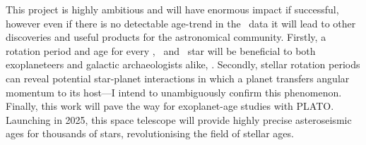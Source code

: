 This project is highly ambitious and will have enormous impact if successful,
however even if there is no detectable age-trend in the \Kepler\ data it will
lead to other discoveries and useful products for the astronomical
community.
Firstly, a rotation period and age for every \Kepler, \Ktwo\ and \TESS\ star
will be beneficial to both exoplaneteers and galactic archaeologists alike,
\citep[e.g.][]{bovy}.
Secondly, stellar rotation periods can reveal potential star-planet
interactions in which a planet transfers angular momentum to its host---I
intend to unambiguously confirm this phenomenon.
Finally, this work will pave the way for exoplanet-age studies with PLATO.
Launching in 2025, this space telescope will provide highly precise
asteroseismic ages for thousands of stars, revolutionising the field of
stellar ages.

